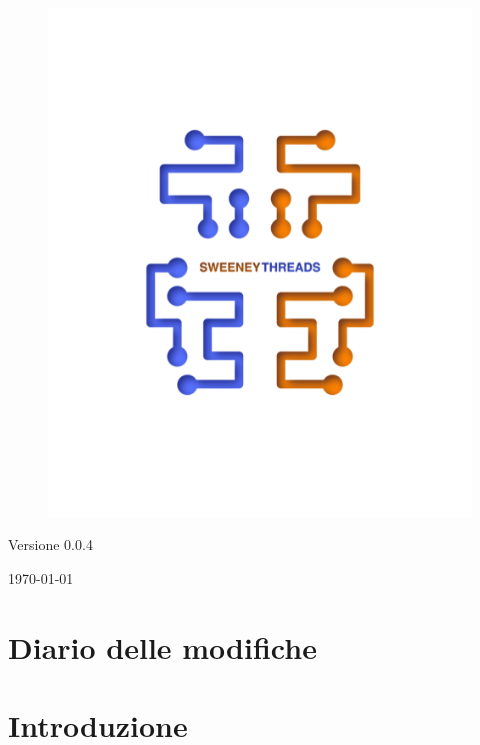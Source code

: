 \documentclass[a4paper]{article}
\begin{document}
\begin{titlepage}
		\begin{figure}[H]
			\centering
			\includegraphics[scale=0.8]{sweeney.png}
		\end{figure}
		\begin{center}
			Versione 0.0.4
		\end{center}
		{\large \today} \\ [3cm] 
		\vfill  
	\end{titlepage}
	
	
	\tableofcontents
	
	\newpage 
	\section*{Diario delle modifiche}

	\newpage \section{Introduzione}
\end{document}
